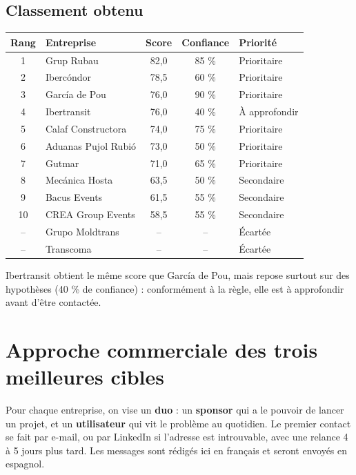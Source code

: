 \documentclass[11pt,a4paper]{article}
\begin{document}
\subsection{Classement obtenu}
\begin{center}
\small
\begin{tabular}{@{}c l c c l@{}}
\toprule
\textbf{Rang} & \textbf{Entreprise} & \textbf{Score} & \textbf{Confiance} & \textbf{Priorité} \\
\midrule
1 & Grup Rubau & 82,0 & 85 \% & Prioritaire \\
2 & Ibercóndor & 78,5 & 60 \% & Prioritaire \\
3 & García de Pou & 76,0 & 90 \% & Prioritaire \\
4 & Ibertransit & 76,0 & 40 \% & À approfondir \\
5 & Calaf Constructora & 74,0 & 75 \% & Prioritaire \\
6 & Aduanas Pujol Rubió & 73,0 & 50 \% & Prioritaire \\
7 & Gutmar & 71,0 & 65 \% & Prioritaire \\
8 & Mecánica Hosta & 63,5 & 50 \% & Secondaire \\
9 & Bacus Events & 61,5 & 55 \% & Secondaire \\
10 & CREA Group Events & 58,5 & 55 \% & Secondaire \\
\midrule
-- & Grupo Moldtrans & -- & -- & Écartée \\
-- & Transcoma & -- & -- & Écartée \\
\bottomrule
\end{tabular}
\end{center}

Ibertransit obtient le même score que García de Pou, mais repose surtout sur des hypothèses (40 \% de confiance) : conformément à la règle, elle est à approfondir avant d'être contactée.

\section{Approche commerciale des trois meilleures cibles}

Pour chaque entreprise, on vise un \textbf{duo} : un \textbf{sponsor} qui a le pouvoir de lancer un projet, et un \textbf{utilisateur} qui vit le problème au quotidien. Le premier contact se fait par e-mail, ou par LinkedIn si l'adresse est introuvable, avec une relance 4 à 5 jours plus tard. Les messages sont rédigés ici en français et seront envoyés en espagnol.
\end{document}
